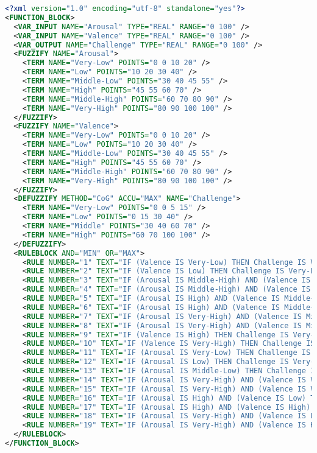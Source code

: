 \begin{lstlisting}[language=xml, frame=none]
<?xml version="1.0" encoding="utf-8" standalone="yes"?>
<FUNCTION_BLOCK>
  <VAR_INPUT NAME="Arousal" TYPE="REAL" RANGE="0 100" />
  <VAR_INPUT NAME="Valence" TYPE="REAL" RANGE="0 100" />
  <VAR_OUTPUT NAME="Challenge" TYPE="REAL" RANGE="0 100" />
  <FUZZIFY NAME="Arousal">
    <TERM NAME="Very-Low" POINTS="0 0 10 20" />
    <TERM NAME="Low" POINTS="10 20 30 40" />
    <TERM NAME="Middle-Low" POINTS="30 40 45 55" />
    <TERM NAME="High" POINTS="45 55 60 70" />
    <TERM NAME="Middle-High" POINTS="60 70 80 90" />
    <TERM NAME="Very-High" POINTS="80 90 100 100" />
  </FUZZIFY>
  <FUZZIFY NAME="Valence">
    <TERM NAME="Very-Low" POINTS="0 0 10 20" />
    <TERM NAME="Low" POINTS="10 20 30 40" />
    <TERM NAME="Middle-Low" POINTS="30 40 45 55" />
    <TERM NAME="High" POINTS="45 55 60 70" />
    <TERM NAME="Middle-High" POINTS="60 70 80 90" />
    <TERM NAME="Very-High" POINTS="80 90 100 100" />
  </FUZZIFY>
  <DEFUZZIFY METHOD="CoG" ACCU="MAX" NAME="Challenge">
    <TERM NAME="Very-Low" POINTS="0 0 5 15" />
    <TERM NAME="Low" POINTS="0 15 30 40" />
    <TERM NAME="Middle" POINTS="30 40 60 70" />
    <TERM NAME="High" POINTS="60 70 100 100" />
  </DEFUZZIFY>
  <RULEBLOCK AND="MIN" OR="MAX">
    <RULE NUMBER="1" TEXT="IF (Valence IS Very-Low) THEN Challenge IS Very-Low" />
    <RULE NUMBER="2" TEXT="IF (Valence IS Low) THEN Challenge IS Very-Low" />
    <RULE NUMBER="3" TEXT="IF (Arousal IS Middle-High) AND (Valence IS Middle-Low) THEN Challenge IS Low" />
    <RULE NUMBER="4" TEXT="IF (Arousal IS Middle-High) AND (Valence IS Middle-High) THEN Challenge IS Low" />
    <RULE NUMBER="5" TEXT="IF (Arousal IS High) AND (Valence IS Middle-Low) THEN Challenge IS Middle" />
    <RULE NUMBER="6" TEXT="IF (Arousal IS High) AND (Valence IS Middle-High) THEN Challenge IS Middle" />
    <RULE NUMBER="7" TEXT="IF (Arousal IS Very-High) AND (Valence IS Middle-Low) THEN Challenge IS High" />
    <RULE NUMBER="8" TEXT="IF (Arousal IS Very-High) AND (Valence IS Middle-High) THEN Challenge IS High" />
    <RULE NUMBER="9" TEXT="IF (Valence IS High) THEN Challenge IS Very-Low" />
    <RULE NUMBER="10" TEXT="IF (Valence IS Very-High) THEN Challenge IS Very-Low" />
    <RULE NUMBER="11" TEXT="IF (Arousal IS Very-Low) THEN Challenge IS Very-Low" />
    <RULE NUMBER="12" TEXT="IF (Arousal IS Low) THEN Challenge IS Very-Low" />
    <RULE NUMBER="13" TEXT="IF (Arousal IS Middle-Low) THEN Challenge IS Very-Low" />
    <RULE NUMBER="14" TEXT="IF (Arousal IS Very-High) AND (Valence IS Very-Low) THEN Challenge IS Middle" />
    <RULE NUMBER="15" TEXT="IF (Arousal IS Very-High) AND (Valence IS Very-High) THEN Challenge IS Middle" />
    <RULE NUMBER="16" TEXT="IF (Arousal IS High) AND (Valence IS Low) THEN Challenge IS Low" />
    <RULE NUMBER="17" TEXT="IF (Arousal IS High) AND (Valence IS High) THEN Challenge IS Low" />
    <RULE NUMBER="18" TEXT="IF (Arousal IS Very-High) AND (Valence IS Low) THEN Challenge IS High" />
    <RULE NUMBER="19" TEXT="IF (Arousal IS Very-High) AND (Valence IS High) THEN Challenge IS High" />
  </RULEBLOCK>
</FUNCTION_BLOCK>
\end{lstlisting}
